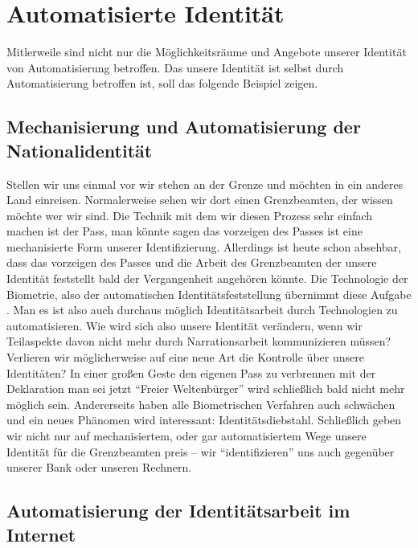 \section {Automatisierte Identität}

Mitlerweile sind nicht nur die Möglichkeitsräume und Angebote unserer Identität von Automatisierung betroffen.
Das unsere Identität ist selbst durch Automatisierung betroffen ist, soll das folgende Beispiel zeigen.

\subsection {Mechanisierung und Automatisierung der Nationalidentität}

Stellen wir uns einmal vor wir stehen an der Grenze und möchten in ein anderes Land einreisen.
Normalerweise sehen wir dort einen Grenzbeamten, der wissen möchte wer wir sind.
Die Technik mit dem wir diesen Prozess sehr einfach machen ist der Pass, man könnte sagen das vorzeigen des Passes ist eine mechanisierte Form unserer Identifizierung.
Allerdings ist heute schon absehbar, dass das vorzeigen des Passes und die Arbeit des Grenzbeamten der unsere Identität feststellt bald der Vergangenheit angehören könnte.
Die Technologie der Biometrie, also der automatischen Identitätsfeststellung übernimmt diese Aufgabe \parencite{knaut}.
Man es ist also auch durchaus möglich Identitätsarbeit durch Technologien zu automatisieren.
Wie wird sich also unsere Identität verändern, wenn wir Teilaspekte davon nicht mehr durch Narrationsarbeit kommunizieren müssen?
Verlieren wir möglicherweise auf eine neue Art die Kontrolle über unsere Identitäten?
In einer großen Geste den eigenen Pass zu verbrennen mit der Deklaration man sei jetzt \enquote{Freier Weltenbürger} wird schließlich bald nicht mehr möglich sein.
Andererseits haben alle Biometrischen Verfahren auch schwächen und ein neues Phänomen wird interessant: Identitätsdiebstahl. 
Schließlich geben wir nicht nur auf mechanisiertem, oder gar automatisiertem Wege unsere Identität für die Grenzbeamten preis – wir \enquote{identifizieren} uns auch gegenüber unserer Bank oder unseren Rechnern.

\subsection {Automatisierung der Identitätsarbeit im Internet}

